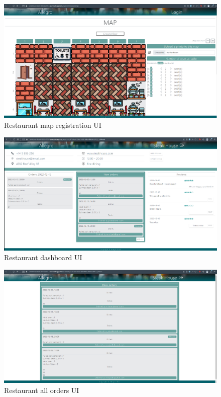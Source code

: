 \begin{figure}[ht]
	\centering
	\includegraphics[width=150mm, keepaspectratio]{figures/UI/11_RestaurantMapEdit.png}
	\caption{Restaurant map registration UI} 
	\label{fig:UI_11}
\end{figure}

\begin{figure}[ht]
	\centering
	\includegraphics[width=150mm, keepaspectratio]{figures/UI/12_Dashboard.png}
	\caption{Restaurant dashboard UI} 
	\label{fig:UI_12}
\end{figure}

\begin{figure}[ht]
	\centering
	\includegraphics[width=150mm, keepaspectratio]{figures/UI/13_Orders.png}
	\caption{Restaurant all orders UI} 
	\label{fig:UI_13}
\end{figure}

